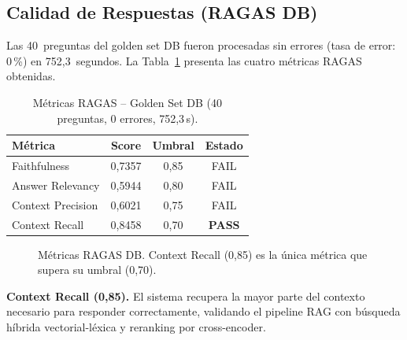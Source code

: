 \documentclass[11pt,a4paper,twocolumn]{article}
\begin{document}
\subsection{Calidad de Respuestas (RAGAS DB)}

Las 40~preguntas del golden set DB fueron procesadas sin errores (tasa de error: 0\,\%) en 752,3~segundos. La Tabla~\ref{tab:ragas_db} presenta las cuatro m\'{e}tricas RAGAS obtenidas.

\begin{table}[H]
\centering
\caption{M\'{e}tricas RAGAS -- Golden Set DB (40 preguntas, 0 errores, 752,3\,s).}
\label{tab:ragas_db}
\footnotesize
\begin{tabularx}{\columnwidth}{lccc}
\toprule
\textbf{M\'{e}trica} & \textbf{Score} & \textbf{Umbral} & \textbf{Estado} \\
\midrule
Faithfulness       & 0,7357 & 0,85 & FAIL \\
Answer Relevancy   & 0,5944 & 0,80 & FAIL \\
Context Precision  & 0,6021 & 0,75 & FAIL \\
Context Recall     & 0,8458 & 0,70 & \textcolor{success}{\textbf{PASS}} \\
\bottomrule
\end{tabularx}
\end{table}

\begin{figure}[H]
\centering
{}
\caption{M\'{e}tricas RAGAS DB. Context Recall (0,85) es la \'{u}nica m\'{e}trica que supera su umbral (0,70).}
\label{fig:ragas_db_barras}
\end{figure}

\textbf{Context Recall (0,85).} El sistema recupera la mayor parte del contexto necesario para responder correctamente, validando el pipeline RAG con b\'{u}squeda h\'{i}brida vectorial-l\'{e}xica y reranking por cross-encoder.
\end{document}
